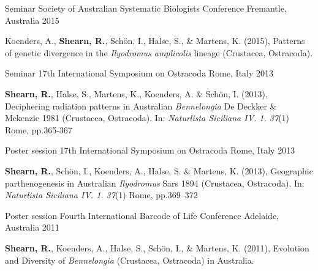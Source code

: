 \begin{cventries}

	\cventry
	{Seminar} %
	{Society of Australian Systematic Biologists Conference} %
	{Fremantle, Australia} %
	{2015} %
	{
		\begin{cvitems} %
			\item {Koenders, A., \textbf{Shearn, R.}, Schön, I., Halse, S., \& Martens, K. (2015), Patterns of genetic divergence in the \textit{Ilyodromus amplicolis} lineage (Crustacea, Ostracoda).}
		\end{cvitems}
	}

	\cventry
	{Seminar} %
	{17th International Symposium on Ostracoda} %
	{Rome, Italy} %
	{2013} %
	{
		\begin{cvitems} %
			\item {\textbf{Shearn, R.}, Halse, S., Martens, K., Koenders, A. \& Schön, I. (2013), Deciphering radiation patterns in Australian \textit{Bennelongia} De Deckker \& Mckenzie 1981 (Crustacea, Ostracoda). In: \emph{Naturlista Siciliana IV. 1. 37}(1) Rome, pp.365-367}
		\end{cvitems}
	}

	\cventry
	{Poster session} %
	{17th International Symposium on Ostracoda} %
	{Rome, Italy} %
	{2013} %
	{
		\begin{cvitems} %
			\item {\textbf{Shearn, R.}, Schön, I., Koenders, A., Halse, S. \& Martens, K. (2013), Geographic parthenogenesis in Australian \textit{Ilyodromus} Sars 1894 (Crustacea, Ostracoda). In: \emph{Naturlista Siciliana IV. 1. 37}(1) Rome, pp.369–372}
		\end{cvitems}
	}

	\cventry
	{Poster session} %
	{Fourth International Barcode of Life Conference} %
	{Adelaide, Australia} %
	{2011} %
	{
		\begin{cvitems} %
			\item {\textbf{Shearn, R.}, Koenders, A., Halse, S., Schön, I., \& Martens, K. (2011), Evolution and Diversity of \textit{Bennelongia} (Crustacea, Ostracoda) in Australia.}
		\end{cvitems}
	}
	

\end{cventries}

